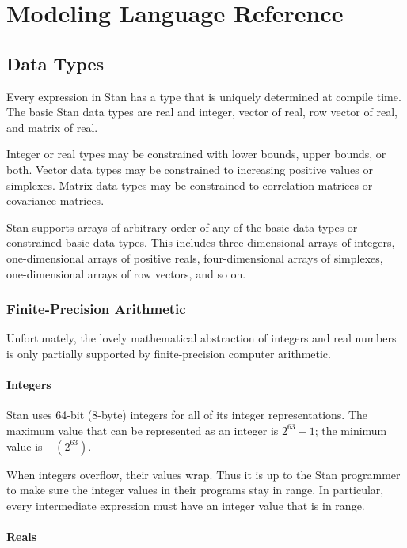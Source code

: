 \documentclass[10pt]{report}
\newcommand{\Stan}{Stan\xspace}
\begin{document}
\part{Modeling Language Reference}

\chapter{Data Types}

Every expression in \Stan has a type that is uniquely determined at
compile time.  The basic \Stan data types are real and integer, vector
of real, row vector of real, and matrix of real.  

Integer or real types may be constrained with lower bounds, upper
bounds, or both.  Vector data types may be constrained to increasing
positive values or simplexes.  Matrix data types may be constrained to
correlation matrices or covariance matrices.

\Stan supports arrays of arbitrary order of any of the basic data
types or constrained basic data types.  This includes
three-dimensional arrays of integers, one-dimensional arrays of
positive reals, four-dimensional arrays of simplexes, one-dimensional
arrays of row vectors, and so on.

\section{Finite-Precision Arithmetic}

Unfortunately, the lovely mathematical abstraction of integers and
real numbers is only partially supported by finite-precision computer
arithmetic.  

\subsection{Integers}

Stan uses 64-bit (8-byte) integers for all of its integer
representations.  The maximum value that can be represented
as an integer is $2^{63}-1$; the minimum value is $-(2^{63})$.

When integers overflow, their values wrap.  Thus it is up to
the \Stan programmer to make sure the integer values in their programs
stay in range.  In particular, every intermediate expression must have
an integer value that is in range.

\subsection{Reals}
\end{document}
